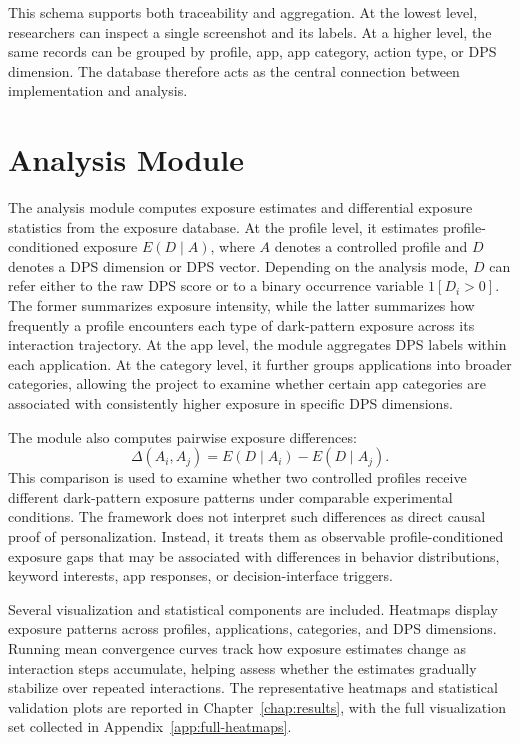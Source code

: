 This schema supports both traceability and aggregation. At the lowest level, researchers can inspect a single screenshot and its labels. At a higher level, the same records can be grouped by profile, app, app category, action type, or DPS dimension. The database therefore acts as the central connection between implementation and analysis.

\section{Analysis Module}

The analysis module computes exposure estimates and differential exposure statistics from the exposure database. At the profile level, it estimates profile-conditioned exposure \(E(D \mid A)\), where \(A\) denotes a controlled profile and \(D\) denotes a DPS dimension or DPS vector. Depending on the analysis mode, \(D\) can refer either to the raw DPS score or to a binary occurrence variable \(1[D_i>0]\). The former summarizes exposure intensity, while the latter summarizes how frequently a profile encounters each type of dark-pattern exposure across its interaction trajectory. At the app level, the module aggregates DPS labels within each application. At the category level, it further groups applications into broader categories, allowing the project to examine whether certain app categories are associated with consistently higher exposure in specific DPS dimensions.

The module also computes pairwise exposure differences:
\[
\Delta(A_i, A_j) = E(D \mid A_i) - E(D \mid A_j).
\]
This comparison is used to examine whether two controlled profiles receive different dark-pattern exposure patterns under comparable experimental conditions. The framework does not interpret such differences as direct causal proof of personalization. Instead, it treats them as observable profile-conditioned exposure gaps that may be associated with differences in behavior distributions, keyword interests, app responses, or decision-interface triggers.

Several visualization and statistical components are included. Heatmaps display exposure patterns across profiles, applications, categories, and DPS dimensions. Running mean convergence curves track how exposure estimates change as interaction steps accumulate, helping assess whether the estimates gradually stabilize over repeated interactions. The representative heatmaps and statistical validation plots are reported in Chapter~\ref{chap:results}, with the full visualization set collected in Appendix~\ref{app:full-heatmaps}.

